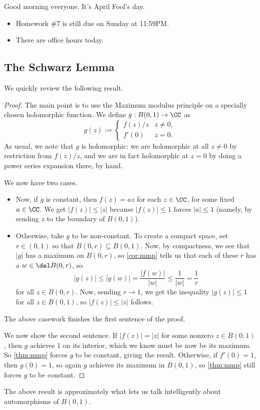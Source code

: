 
Good morning everyone. It's April Fool's day.
\begin{itemize}
	\item Homework \#7 is still due on Sunday at 11:59PM.
	\item There are office hours today.
\end{itemize}

\subsection{The Schwarz Lemma}
We quickly review the following result.
\schwarzlemma*
\begin{proof}
	The main point is to use the Maximum modulus principle on a specially chosen holomorphic function. We define $g:B(0,1)\to\CC$ as
	\[g(z):=\begin{cases}
		f(z)/z & z\ne0, \\
		f'(0) & z=0.
	\end{cases}\]
	As usual, we note that $g$ is holomorphic: we are holomorphic at all $z\ne0$ by restriction from $f(z)/z$, and we are in fact holomorphic at $z=0$ by doing a power series expansion there, by hand.

	We now have two cases.
	\begin{itemize}
		\item Now, if $g$ is constant, then $f(z)=az$ for each $z\in\CC$, for some fixed $a\in\CC$. We get $|f(z)|\le|z|$ because $|f(z)|\le1$ forces $|a|\le1$ (namely, by sending $z$ to the boundary of $B(0,1)$).
		\item Otherwise, take $g$ to be non-constant. To create a compact space, set $r\in(0,1)$ so that $\overline{B(0,r)}\subseteq B(0,1)$. Now, by compactness, we see that $|g|$ has a maximum on $\overline{B(0,r)}$, so \autoref{cor:mmp} tells us that each of these $r$ has a $w\in\del B(0,r)$, so
		\[|g(z)|\le|g(w)|=\frac{|f(w)|}{|w|}\le\frac1{|w|}=\frac1r\]
		for all $z\in B(0,r)$. Now, sending $r\to 1$, we get the inequality $|g(z)|\le1$ for all $z\in B(0,1)$, so $|f(z)|\le|z|$ follows.
	\end{itemize}
	The above casework finishes the first sentence of the proof.

	We now show the second sentence. If $|f(z)|=|z|$ for some nonzero $z\in B(0,1)$, then $g$ achieves $1$ on its interior, which we know must be now be its maximum. So \autoref{thm:mmp} forces $g$ to be constant, giving the result. Otherwise, if $f'(0)=1$, then $g(0)=1$, so again $g$ achieves its maximum in $B(0,1)$, so \autoref{thm:mmp} still forces $g$ to be constant.
\end{proof}
\begin{remark}
	The above result is approximately what lets us talk intelligently about automorphisms of $B(0,1)$.
\end{remark}

